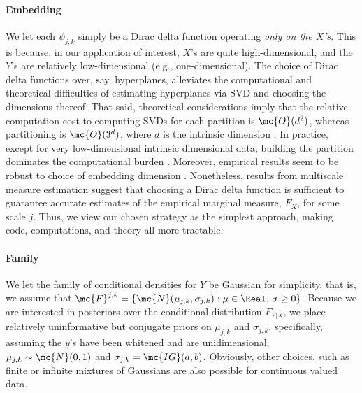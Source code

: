 \paragraph{Embedding} We let each $\psi_{j,k}$ simply be a Dirac delta function operating \emph{only on the $X$'s}.  This is because, in our application of interest, $X$'s are quite high-dimensional, and the $Y$'s are relatively low-dimensional (e.g., one-dimensional).  The choice of Dirac delta functions over, say, hyperplanes, alleviates the computational and theoretical difficulties of estimating hyperplanes via SVD and choosing the dimensions thereof. That said,  theoretical considerations imply that the relative computation cost to computing SVDs for each partition is $\mc{O}(d^2)$, whereas partitioning  is  
$\mc{O}(3^d)$, where $d$ is the intrinsic dimension \cite{Allard2012}. In practice, except for very low-dimensional intrinsic dimensional data, building the partition dominates the computational burden \cite{Allard2012}.  Moreover, empirical results seem to be robust to choice of embedding dimension \cite{Lawlor2012}. Nonetheless, results from multiscale measure estimation \cite{ChenMaggioni12} suggest that choosing a Dirac delta function is sufficient to guarantee accurate estimates of the empirical marginal measure, $F_X$, for some scale $j$.  Thus, we view our chosen strategy as the simplest approach, making code, computations, and theory all more tractable.  


\paragraph{Family} We let the family of conditional densities for $Y$ be Gaussian for simplicity, that is, we assume that $\mc{F}^{j,k}=\{\mc{N}(\mu_{j,k}, {\sigma}_{j,k}) : \mu \in \Real, \, \sigma \geq 0\}$. Because we are interested in posteriors over the conditional distribution $F_{Y|X}$, we place relatively uninformative but conjugate priors on $\mu_{j,k}$ and ${\sigma}_{j,k}$, specifically, assuming the $y$'s have been whitened and are unidimensional,  
${\mu}_{j,k} \sim \mc{N}(0,1)$ and ${\sigma}_{j,k}=\mc{IG}(a,b)$.  
Obviously, other choices, such as finite or infinite mixtures of Gaussians are also possible for continuous valued data.  




